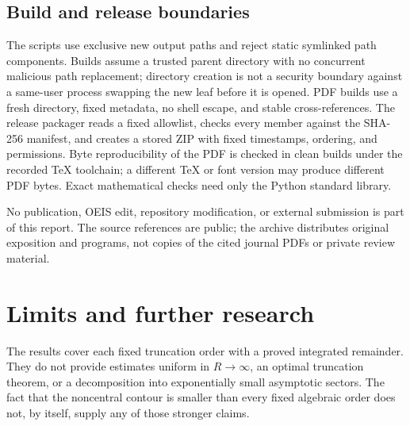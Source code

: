 \documentclass[11pt,letterpaper]{article}
\numberwithin{equation}{section}
\theoremstyle{definition}\newtheorem{definition}[theorem]{Definition}
\theoremstyle{remark}\newtheorem{remark}[theorem]{Remark}
\begin{document}
\subsection{Build and release boundaries}

The scripts use exclusive new output paths and reject static symlinked
path components. Builds assume a trusted parent directory with no
concurrent malicious path replacement; directory creation is not a
security boundary against a same-user process swapping the new leaf
before it is opened. PDF builds use a fresh directory, fixed metadata,
no shell escape, and stable cross-references. The release packager
reads a fixed allowlist, checks every member against the SHA-256
manifest, and creates a stored ZIP with fixed timestamps, ordering,
and permissions. Byte reproducibility of the PDF is checked in
clean builds under the recorded TeX toolchain; a different TeX or
font version may produce different PDF bytes. Exact mathematical
checks need only the Python standard library.

No publication, OEIS edit, repository modification, or external
submission is part of this report. The source references are public;
the archive distributes original exposition and programs, not copies
of the cited journal PDFs or private review material.

\section{Limits and further research}\label{sfp:pc:sec:questions}

The results cover each fixed truncation order with a proved
integrated remainder. They do not provide estimates uniform in
$R\to\infty$, an optimal truncation theorem, or a decomposition
into exponentially small asymptotic sectors. The fact that the
noncentral contour is smaller than every fixed algebraic order
does not, by itself, supply any of those stronger claims.
\end{document}
